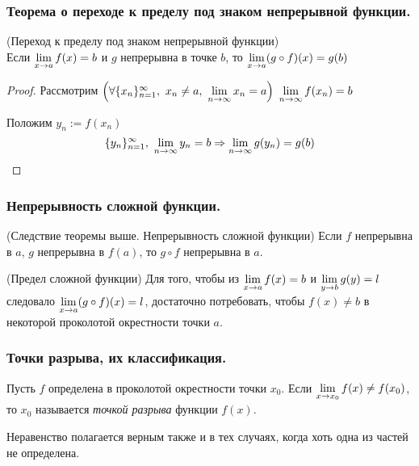\subsubsection{Теорема о переходе к пределу под знаком непрерывной функции.}
\begin{theorem} (Переход к пределу под знаком непрерывной функции) \\
	Если $\lim\limits_{x \to a} f(x) = b$ и $g$ непрерывна в точке $b$, то $\lim\limits_{x \to a} (g \circ f)(x) = g(b)$
\end{theorem}

\begin{proof}
	Рассмотрим $\left(\forall \{x_n\}_{n = 1}^\infty,\ x_n \neq a,\ \lim\limits_{n \to \infty} x_n = a\right)\ \lim\limits_{n \to \infty} f(x_n) = b$
	
	Положим $y_n := f(x_n)$
	$$
		\{y_n\}_{n = 1}^\infty,\ \lim\limits_{n \to \infty} y_n = b \Rightarrow \lim\limits_{n \to \infty} g(y_n) = g(b) 
	$$
\end{proof}

\subsubsection{Непрерывность сложной функции.}

\begin{addition} (Следствие теоремы выше. Непрерывность сложной функции)
	Если $f$ непрерывна в $a$, $g$ непрерывна в $f(a)$, то $g \circ f$ непрерывна в $a$.
\end{addition}

\begin{note} (Предел сложной функции)
	Для того, чтобы из $\lim\limits_{x \to a} f(x) = b$ и $\lim\limits_{y \to b} g(y) = l$ следовало $\lim\limits_{x \to a} (g \circ f)(x) = l$, достаточно потребовать, чтобы $f(x) \neq b$ в некоторой проколотой окрестности точки $a$.
\end{note}

\subsubsection{Точки разрыва, их классификация.}

\begin{definition}
	Пусть $f$ определена в проколотой окрестности точки $x_0$. Если $\lim\limits_{x \to x_0} f(x) \neq f(x_0)$, то $x_0$ называется \textit{точкой разрыва} функции $f(x)$.
\end{definition}

\begin{note}
	Неравенство полагается верным также и в тех случаях, когда хоть одна из частей не определена.
\end{note}

